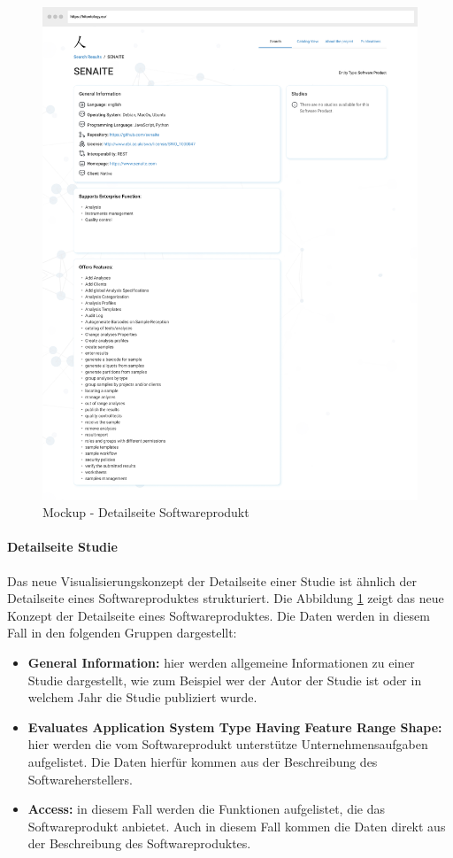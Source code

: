\begin{figure}[H]
	\centering
    	\includegraphics[width=\textwidth]{Images/SP_Detailseite}
   	\caption{Mockup - Detailseite Softwareprodukt}
   	\label{fig:mockup_sp_detail}
\end{figure}

\paragraph{Detailseite Studie}

Das neue Visualisierungskonzept der Detailseite einer Studie ist ähnlich der Detailseite eines Softwareproduktes strukturiert.
Die Abbildung \ref{fig:mockup_sp_detail} zeigt das neue Konzept der Detailseite eines Softwareproduktes.
Die Daten werden in diesem Fall in den folgenden Gruppen dargestellt:

\begin{itemize}
\item \textbf{General Information:} hier werden allgemeine Informationen zu einer Studie dargestellt, wie zum Beispiel wer der Autor der Studie ist oder in welchem Jahr die Studie publiziert wurde.
\item \textbf{Evaluates Application System Type Having Feature Range Shape:} hier werden die vom Softwareprodukt unterstütze Unternehmensaufgaben aufgelistet. Die Daten hierfür kommen aus der Beschreibung des Softwareherstellers.
\item \textbf{Access:} in diesem Fall werden die Funktionen aufgelistet, die das Softwareprodukt anbietet. Auch in diesem Fall kommen die Daten direkt aus der Beschreibung des Softwareproduktes.
\end{itemize}

